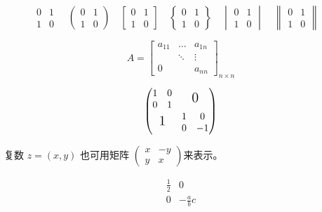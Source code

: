 \documentclass{ctexart}
\begin{document}
	\[
	\begin{matrix}	%
		0 & 1 \\
		1 & 0
	\end{matrix}	\quad
	\begin{pmatrix}	%
		0 & 1 \\
		1 & 0
	\end{pmatrix}	\quad
	\begin{bmatrix}	%
		0 & 1 \\
		1 & 0
	\end{bmatrix}	\quad
	\begin{Bmatrix}	%
		0 & 1 \\
		1 & 0
	\end{Bmatrix}	\quad
	\begin{vmatrix}	%
		0 & 1 \\
		1 & 0
	\end{vmatrix}	\quad
	\begin{Vmatrix}	%
		0 & 1 \\
		1 & 0
	\end{Vmatrix}	\quad
	\]
	
	\[
	A = 
	\begin{bmatrix}
		a_{11} & \dots & a_{1n}	\\
		& \ddots & \vdots \\
		0 & & a_{nn}
	\end{bmatrix}_{n \times n}
	\]
	
	\[
	\begin{pmatrix}
		\begin{matrix}	1&0\\0&1 \end{matrix}
		& \text{\Large 0}	\\
		\text{\Large 1}
		& \begin{matrix} 1&0\\0&-1 \end{matrix}

	\end{pmatrix}
	\]
	
	复数 $z = (x,y)$ 也可用矩阵
	\begin{math}
		\left(	%
		\begin{smallmatrix}
			x & -y \\ y & x
		\end{smallmatrix}
		\right)	%
	\end{math}来表示。

	\[
	\begin{array}{l|l}
		\frac{1}{2} & 0 \\
		\hline
		0 & -\frac{a}{b}c	\\
	\end{array}
	\]
\end{document}
